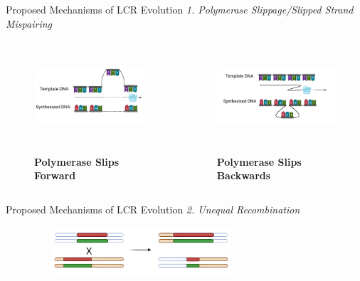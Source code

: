 \documentclass{beamer}
\begin{document}
	\begin{frame}{Proposed Mechanisms of LCR Evolution}
		\textit{1. Polymerase Slippage/Slipped Strand Mispairing}
		\begin{columns}
			
			\centering
			\begin{figure}
				\includegraphics[width=\columnwidth, height=2.5cm]{slippage2n.png} \\~\\
				\caption{\centering \textbf{Polymerase Slips Forward}}
			\end{figure}
			
			\centering
			\begin{figure}
				\vspace{0.5cm}
				\includegraphics[width=\columnwidth, height=2.5cm]{slippage1n.png} \\~\\
				\caption{\centering \textbf{Polymerase Slips Backwards}}
			\end{figure}
		
		\end{columns}
	
	\vspace{2cm}\tiny\cite{levinson1987slipped,sehn2015insertions}
	\end{frame}

	\begin{frame}{Proposed Mechanisms of LCR Evolution}
		\textit{2. Unequal Recombination} \newline\newline
		
		\begin{figure}
			\includegraphics[width=8cm, height=1.8cm]{unequal.png} \\~\\
		\end{figure}
		
	\vspace{2cm}\tiny\cite{mirkin2007expandable}
	\end{frame}
	
\end{document}
